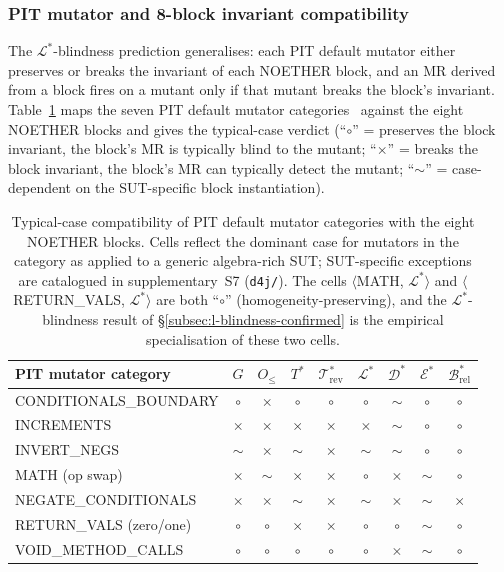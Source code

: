 \documentclass[acmsmall, screen]{acmart}
\begin{document}
\subsubsection{PIT mutator and 8-block invariant compatibility}
\label{subsec:pit-block-matrix}

The $\mathcal{L}^{*}$-blindness prediction generalises: each PIT
default mutator either preserves or breaks the invariant of each
NOETHER block, and an MR derived from a block fires on a mutant only
if that mutant breaks the block's invariant. Table~\ref{tab:pit-block}
maps the seven PIT default mutator categories~\cite{Coles2016PIT}
against the eight NOETHER blocks and gives the typical-case verdict
(``$\circ$'' = preserves the block invariant, the block's MR is
typically blind to the mutant; ``$\times$'' = breaks the block
invariant, the block's MR can typically detect the mutant; ``$\sim$''
= case-dependent on the SUT-specific block instantiation).

\begin{table}[h]
\centering
\caption{Typical-case compatibility of PIT default mutator categories
with the eight NOETHER blocks. Cells reflect the dominant case for
mutators in the category as applied to a generic algebra-rich SUT;
SUT-specific exceptions are catalogued in
supplementary~S7 (\texttt{d4j/}). The cells $\langle$MATH, $\mathcal{L}^{*}\rangle$
and $\langle$RETURN\_VALS, $\mathcal{L}^{*}\rangle$ are both
``$\circ$'' (homogeneity-preserving), and the
$\mathcal{L}^{*}$-blindness result of \S\ref{subsec:l-blindness-confirmed}
is the empirical specialisation of these two cells.}
\label{tab:pit-block}
\small
\begin{tabular}{lcccccccc}
\toprule
PIT mutator category & $G$ & $O_{\le}$ & $T^{*}$ & $\mathcal{T}^{*}_{\mathrm{rev}}$ & $\mathcal{L}^{*}$ & $\mathcal{D}^{*}$ & $\mathcal{E}^{*}$ & $\mathcal{B}^{*}_{\mathrm{rel}}$ \\
\midrule
CONDITIONALS\_BOUNDARY & $\circ$ & $\times$ & $\circ$ & $\circ$ & $\circ$ & $\sim$ & $\circ$ & $\circ$ \\
INCREMENTS             & $\times$ & $\times$ & $\times$ & $\times$ & $\times$ & $\sim$ & $\circ$ & $\circ$ \\
INVERT\_NEGS           & $\sim$ & $\times$ & $\sim$ & $\times$ & $\sim$ & $\sim$ & $\circ$ & $\circ$ \\
MATH (op swap)         & $\times$ & $\sim$ & $\times$ & $\times$ & $\circ$ & $\times$ & $\sim$ & $\circ$ \\
NEGATE\_CONDITIONALS   & $\times$ & $\times$ & $\sim$ & $\times$ & $\sim$ & $\times$ & $\sim$ & $\times$ \\
RETURN\_VALS (zero/one) & $\circ$ & $\circ$ & $\times$ & $\times$ & $\circ$ & $\circ$ & $\sim$ & $\circ$ \\
VOID\_METHOD\_CALLS    & $\circ$ & $\circ$ & $\circ$ & $\circ$ & $\circ$ & $\times$ & $\sim$ & $\circ$ \\
\bottomrule
\end{tabular}
\end{table}
\end{document}
